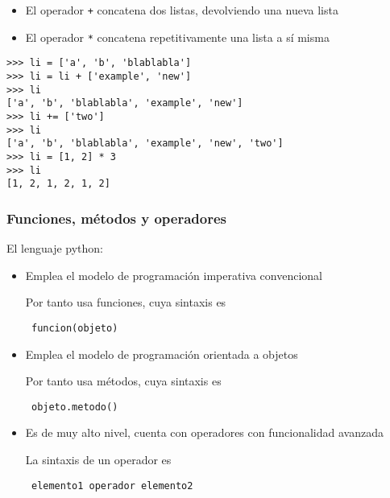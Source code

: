 \documentclass[ucs]{beamer}
\begin{document}


\begin{frame}[fragile]

\begin{itemize}
\item El operador \verb|+| concatena dos listas, devolviendo una nueva
  lista
\item El operador \verb|*| concatena repetitivamente una lista a sí
  misma
\end{itemize}

\begin{scriptsize}
\begin{verbatim}
>>> li = ['a', 'b', 'blablabla']
>>> li = li + ['example', 'new'] 
>>> li
['a', 'b', 'blablabla', 'example', 'new']
>>> li += ['two']                
>>> li
['a', 'b', 'blablabla', 'example', 'new', 'two']
>>> li = [1, 2] * 3              
>>> li
[1, 2, 1, 2, 1, 2]
\end{verbatim}
\end{scriptsize}

\end{frame}



\begin{frame}[fragile]
\frametitle{Funciones, métodos y operadores}

El lenguaje python:


\begin{itemize}
\item
Emplea el modelo de programación imperativa convencional

Por tanto usa funciones, cuya sintaxis es

\verb| funcion(objeto)|

\item
Emplea el modelo de programación orientada a objetos

Por tanto usa métodos, cuya sintaxis es

\verb| objeto.metodo() |

\item
Es de muy alto nivel, cuenta con operadores con funcionalidad
avanzada

La sintaxis de un operador es

\verb| elemento1 operador elemento2|

\end{itemize}

\end{frame}
\end{document}

